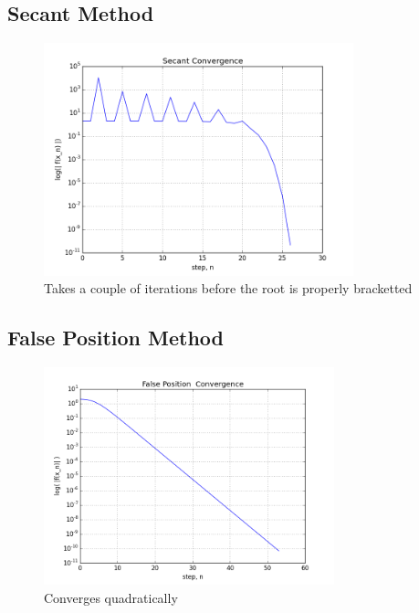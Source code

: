 \documentclass[12pt]{article}
\begin{document}
  \clearpage
  
  \subsection{Secant Method}
  
  \begin{figure}[h!]
    \centering
    \includegraphics[width=0.8\textwidth]{Problem4b.png}
    \caption{Takes a couple of iterations before the root is properly bracketted}
  \end{figure}


  \clearpage

  \subsection{False Position Method}
  
  \begin{figure}[h!]
    \centering
    \includegraphics[width=0.75\textwidth]{Problem4c.png}
    \caption{Converges quadratically}
  \end{figure}
\end{document}
